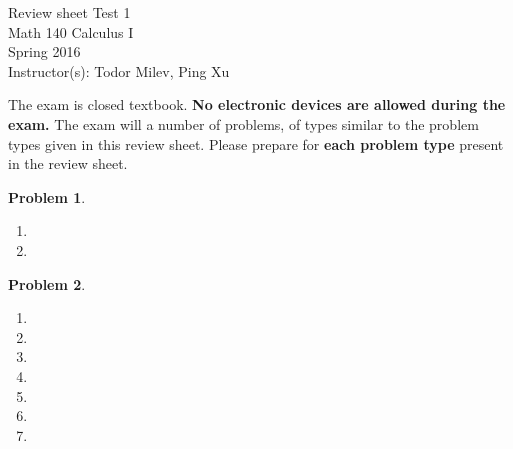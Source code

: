 \documentclass{article}
\newtheorem{problem}{Problem}
\begin{document}
\begin{center}
\Large
Review sheet Test 1 \\ Math 140 Calculus I \\ \normalsize Spring 2016 \\ Instructor(s): Todor Milev, Ping Xu
\end{center}



\noindent The exam is closed textbook. \textbf{No electronic devices are allowed during the exam. } The exam will a number of problems, of types similar to the problem types given in this review sheet. Please prepare for \textbf{each problem type} present in the review sheet. %

\begin{problem}~
\begin{multicols}{2}
\begin{enumerate}
\item 
\item 
\end{enumerate}
\end{multicols}
\end{problem}

\begin{problem}~
\begin{multicols}{2}
\begin{enumerate}
\item 
\item 

\item 
\item 
\item 
\item 

\item 

\end{enumerate}
\end{multicols}
\end{problem}

\end{document}
